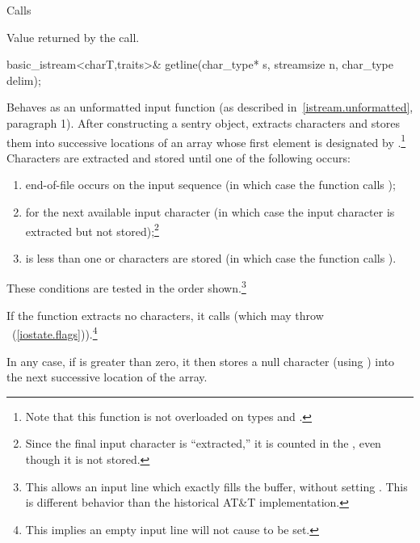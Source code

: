 \begin{itemdescr}
\pnum
\effects
Calls

\pnum
\returns
Value returned by the call.
\end{itemdescr}

%
\begin{itemdecl}
basic_istream<charT,traits>& getline(char_type* s, streamsize n,
                      char_type delim);
\end{itemdecl}

\begin{itemdescr}
\pnum
\effects
Behaves as an unformatted input function
(as described in~\ref{istream.unformatted}, paragraph 1).
After constructing a sentry object, extracts
characters and stores them
into successive locations of an array whose first element is designated by
.\footnote{Note that this function is not overloaded on types
and
.}
Characters are extracted and stored until one of the following occurs:
\begin{enumerate}
\item
end-of-file occurs on the input sequence
(in which case the function calls
);
\item
{}
for the next available input
character 
(in which case the input character is extracted but not stored);\footnote{Since
the final input character is ``extracted,''
it is counted in the
,
even though it is not stored.}
\item
{} is less than one or 
characters are stored
(in which case the function calls
).
\end{enumerate}

\pnum
These conditions are tested in the order shown.\footnote{This allows an input
line which exactly fills the buffer, without setting
.
This is different behavior than the historical AT\&T implementation.}

\pnum
If the function extracts no characters, it calls
(which may throw
~(\ref{iostate.flags})).\footnote{This implies an
empty input line will not cause
to be set.}

\pnum
In any case, if  is greater than zero, it then stores a null character
(using
)
into the next successive location of the array.


\end{itemdescr}
